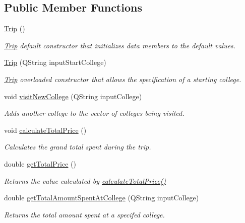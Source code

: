 \subsection*{Public Member Functions}
\begin{DoxyCompactItemize}
\item 
\hyperlink{class_trip_aa67b77d0d2de622ed5eb9e9cad34db8f}{Trip} ()
\begin{DoxyCompactList}\small\item\em \hyperlink{class_trip}{Trip} default constructor that initializes data members to the default values. \end{DoxyCompactList}\item 
\hyperlink{class_trip_a1151ea3cd9f01ba725095b1efaf2bfba}{Trip} (Q\+String input\+Start\+College)
\begin{DoxyCompactList}\small\item\em \hyperlink{class_trip}{Trip} overloaded constructor that allows the specification of a starting college. \end{DoxyCompactList}\item 
void \hyperlink{class_trip_a58073e12498a5cb48d835a53609b0ca6}{visit\+New\+College} (Q\+String input\+College)
\begin{DoxyCompactList}\small\item\em Adds another college to the vector of colleges being visited. \end{DoxyCompactList}\item 
void \hyperlink{class_trip_aff64975175eb1a0c55d408ea5521e092}{calculate\+Total\+Price} ()
\begin{DoxyCompactList}\small\item\em Calculates the grand total spent during the trip. \end{DoxyCompactList}\item 
double \hyperlink{class_trip_abf1da7d48ac859be42992e1fc3489e50}{get\+Total\+Price} ()
\begin{DoxyCompactList}\small\item\em Returns the value calculated by \hyperlink{class_trip_aff64975175eb1a0c55d408ea5521e092}{calculate\+Total\+Price()} \end{DoxyCompactList}\item 
double \hyperlink{class_trip_a8e1b96a203349d61a8b85342c2487d81}{get\+Total\+Amount\+Spent\+At\+College} (Q\+String input\+College)
\begin{DoxyCompactList}\small\item\em Returns the total amount spent at a specifed college. \end{DoxyCompactList}\item 

\end{DoxyCompactItemize}
